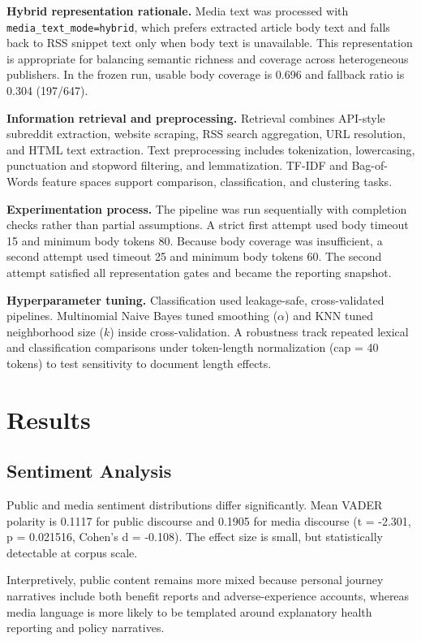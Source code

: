 \documentclass[10pt,letterpaper,twocolumn]{article}
\begin{document}
\textbf{Hybrid representation rationale.} Media text was processed with \texttt{media\_text\_mode=hybrid}, which prefers extracted article body text and falls back to RSS snippet text only when body text is unavailable. This representation is appropriate for balancing semantic richness and coverage across heterogeneous publishers. In the frozen run, usable body coverage is 0.696 and fallback ratio is 0.304 (197/647).

\textbf{Information retrieval and preprocessing.} Retrieval combines API-style subreddit extraction, website scraping, RSS search aggregation, URL resolution, and HTML text extraction. Text preprocessing includes tokenization, lowercasing, punctuation and stopword filtering, and lemmatization. TF-IDF and Bag-of-Words feature spaces support comparison, classification, and clustering tasks.

\textbf{Experimentation process.} The pipeline was run sequentially with completion checks rather than partial assumptions. A strict first attempt used body timeout 15 and minimum body tokens 80. Because body coverage was insufficient, a second attempt used timeout 25 and minimum body tokens 60. The second attempt satisfied all representation gates and became the reporting snapshot.

\textbf{Hyperparameter tuning.} Classification used leakage-safe, cross-validated pipelines. Multinomial Naive Bayes tuned smoothing ($\alpha$) and KNN tuned neighborhood size ($k$) inside cross-validation. A robustness track repeated lexical and classification comparisons under token-length normalization (cap = 40 tokens) to test sensitivity to document length effects.

\section{Results}
\subsection{Sentiment Analysis}
Public and media sentiment distributions differ significantly. Mean VADER polarity is 0.1117 for public discourse and 0.1905 for media discourse (t = -2.301, p = 0.021516, Cohen's d = -0.108). The effect size is small, but statistically detectable at corpus scale.

Interpretively, public content remains more mixed because personal journey narratives include both benefit reports and adverse-experience accounts, whereas media language is more likely to be templated around explanatory health reporting and policy narratives.
\end{document}
